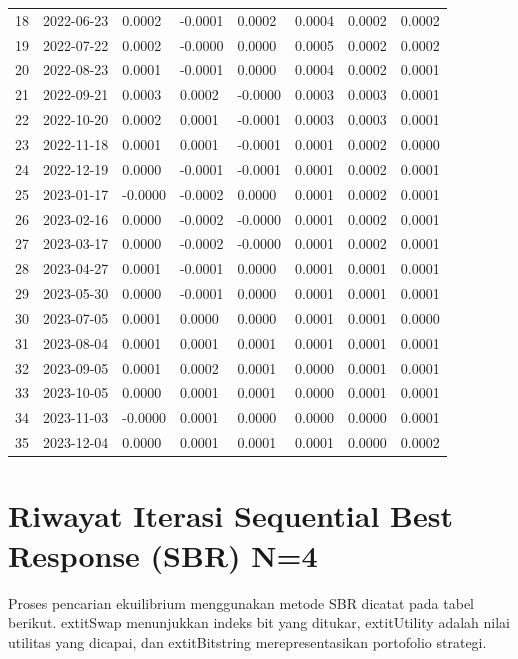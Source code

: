 \begin{footnotesize}
\begin{longtable}{llllllll}
18 & 2022-06-23 & 0.0002 & -0.0001 & 0.0002 & 0.0004 & 0.0002 & 0.0002 \\
19 & 2022-07-22 & 0.0002 & -0.0000 & 0.0000 & 0.0005 & 0.0002 & 0.0002 \\
20 & 2022-08-23 & 0.0001 & -0.0001 & 0.0000 & 0.0004 & 0.0002 & 0.0001 \\
21 & 2022-09-21 & 0.0003 & 0.0002 & -0.0000 & 0.0003 & 0.0003 & 0.0001 \\
22 & 2022-10-20 & 0.0002 & 0.0001 & -0.0001 & 0.0003 & 0.0003 & 0.0001 \\
23 & 2022-11-18 & 0.0001 & 0.0001 & -0.0001 & 0.0001 & 0.0002 & 0.0000 \\
24 & 2022-12-19 & 0.0000 & -0.0001 & -0.0001 & 0.0001 & 0.0002 & 0.0001 \\
25 & 2023-01-17 & -0.0000 & -0.0002 & 0.0000 & 0.0001 & 0.0002 & 0.0001 \\
26 & 2023-02-16 & 0.0000 & -0.0002 & -0.0000 & 0.0001 & 0.0002 & 0.0001 \\
27 & 2023-03-17 & 0.0000 & -0.0002 & -0.0000 & 0.0001 & 0.0002 & 0.0001 \\
28 & 2023-04-27 & 0.0001 & -0.0001 & 0.0000 & 0.0001 & 0.0001 & 0.0001 \\
29 & 2023-05-30 & 0.0000 & -0.0001 & 0.0000 & 0.0001 & 0.0001 & 0.0001 \\
30 & 2023-07-05 & 0.0001 & 0.0000 & 0.0000 & 0.0001 & 0.0001 & 0.0000 \\
31 & 2023-08-04 & 0.0001 & 0.0001 & 0.0001 & 0.0001 & 0.0001 & 0.0001 \\
32 & 2023-09-05 & 0.0001 & 0.0002 & 0.0001 & 0.0000 & 0.0001 & 0.0001 \\
33 & 2023-10-05 & 0.0000 & 0.0001 & 0.0001 & 0.0000 & 0.0001 & 0.0001 \\
34 & 2023-11-03 & -0.0000 & 0.0001 & 0.0000 & 0.0000 & 0.0000 & 0.0001 \\
35 & 2023-12-04 & 0.0000 & 0.0001 & 0.0001 & 0.0001 & 0.0000 & 0.0002 \\
\end{longtable}
\end{footnotesize}

\section{Riwayat Iterasi Sequential Best Response (SBR) N=4}

Proses pencarian ekuilibrium menggunakan metode SBR dicatat pada tabel berikut. 	extit{Swap} menunjukkan indeks bit yang ditukar, 	extit{Utility} adalah nilai utilitas yang dicapai, dan 	extit{Bitstring} merepresentasikan portofolio strategi.

